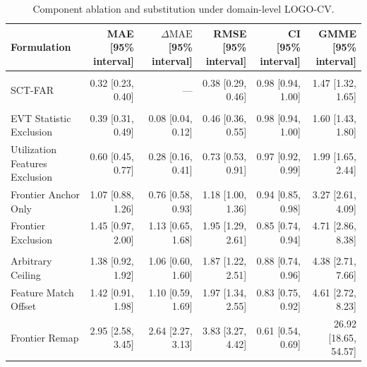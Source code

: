 \documentclass{article}
\begin{document}
\clearpage
\begin{table}[H]
\centering
\scriptsize
\captionsetup{position=top,skip=12pt}
\caption{Component ablation and substitution under domain-level LOGO-CV.}
\label{tab:si-ablation}
\setlength{\tabcolsep}{2pt}
\begin{tabularx}{\linewidth}{@{}>{\raggedright\arraybackslash}Xrrrrr@{}}
\toprule
Formulation & \shortstack{MAE\\{[95\% interval]}} & \shortstack{$\Delta\mathrm{MAE}$\\{[95\% interval]}} & \shortstack{RMSE\\{[95\% interval]}} & \shortstack{CI\\{[95\% interval]}} & \shortstack{GMME\\{[95\% interval]}} \\
\midrule
\multicolumn{6}{@{}l}{\textbf{Reference}} \\
SCT-FAR & 0.32 [0.23, 0.40] & --- & 0.38 [0.29, 0.46] & 0.98 [0.94, 1.00] & 1.47 [1.32, 1.65] \\
\addlinespace
\multicolumn{6}{@{}l}{\textbf{Component Ablation}} \\
EVT Statistic Exclusion & 0.39 [0.31, 0.49] & 0.08 [0.04, 0.12] & 0.46 [0.36, 0.55] & 0.98 [0.94, 1.00] & 1.60 [1.43, 1.80] \\
Utilization Features Exclusion & 0.60 [0.45, 0.77] & 0.28 [0.16, 0.41] & 0.73 [0.53, 0.91] & 0.97 [0.92, 0.99] & 1.99 [1.65, 2.44] \\
Frontier Anchor Only & 1.07 [0.88, 1.26] & 0.76 [0.58, 0.93] & 1.18 [1.00, 1.36] & 0.94 [0.85, 0.98] & 3.27 [2.61, 4.09] \\
Frontier Exclusion & 1.45 [0.97, 2.00] & 1.13 [0.65, 1.68] & 1.95 [1.29, 2.61] & 0.85 [0.74, 0.94] & 4.71 [2.86, 8.38] \\
\addlinespace
\multicolumn{6}{@{}l}{\textbf{Substitution}} \\
Arbitrary Ceiling & 1.38 [0.92, 1.92] & 1.06 [0.60, 1.60] & 1.87 [1.22, 2.51] & 0.88 [0.74, 0.96] & 4.38 [2.71, 7.66] \\
Feature Match Offset & 1.42 [0.91, 1.98] & 1.10 [0.59, 1.69] & 1.97 [1.34, 2.55] & 0.83 [0.75, 0.92] & 4.61 [2.72, 8.23] \\
Frontier Remap & 2.95 [2.58, 3.45] & 2.64 [2.27, 3.13] & 3.83 [3.27, 4.42] & 0.61 [0.54, 0.69] & 26.92 [18.65, 54.57] \\
\bottomrule
\end{tabularx}
\par\vspace{12pt}
\begin{minipage}{\linewidth}

\end{minipage}
\end{table}
\end{document}

